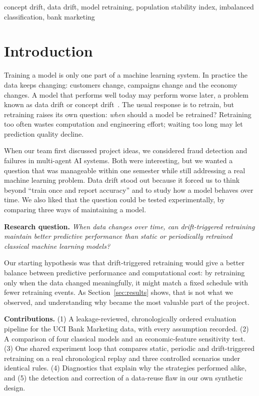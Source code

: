 \documentclass[conference]{IEEEtran}
\begin{document}
\begin{IEEEkeywords}
concept drift, data drift, model retraining, population stability index, imbalanced classification, bank marketing
\end{IEEEkeywords}

\section{Introduction}

Training a model is only one part of a machine learning system. In practice the data keeps changing: customers change, campaigns change and the economy changes. A model that performs well today may perform worse later, a problem known as data drift or concept drift~\cite{gama2014survey,lu2019review}. The usual response is to retrain, but retraining raises its own question: \emph{when} should a model be retrained? Retraining too often wastes computation and engineering effort; waiting too long may let prediction quality decline.

When our team first discussed project ideas, we considered fraud detection and failures in multi-agent AI systems. Both were interesting, but we wanted a question that was manageable within one semester while still addressing a real machine learning problem. Data drift stood out because it forced us to think beyond ``train once and report accuracy'' and to study how a model behaves over time. We also liked that the question could be tested experimentally, by comparing three ways of maintaining a model.

\textbf{Research question.} \emph{When data changes over time, can drift-triggered retraining maintain better predictive performance than static or periodically retrained classical machine learning models?}

Our starting hypothesis was that drift-triggered retraining would give a better balance between predictive performance and computational cost: by retraining only when the data changed meaningfully, it might match a fixed schedule with fewer retraining events. As Section~\ref{sec:results} shows, that is not what we observed, and understanding why became the most valuable part of the project.

\textbf{Contributions.} (1) A leakage-reviewed, chronologically ordered evaluation pipeline for the UCI Bank Marketing data, with every assumption recorded. (2) A comparison of four classical models and an economic-feature sensitivity test. (3) One shared experiment loop that compares static, periodic and drift-triggered retraining on a real chronological replay and three controlled scenarios under identical rules. (4) Diagnostics that explain why the strategies performed alike, and (5) the detection and correction of a data-reuse flaw in our own synthetic design.
\end{document}
